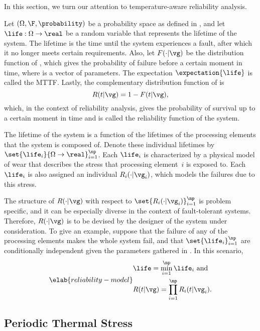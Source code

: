 In this section, we turn our attention to temperature-aware reliability
analysis.

Let $(\Omega, \F, \probability)$ be a probability space as defined in
, and let $\life: \Omega \to \real$ be a random
variable that represents the lifetime of the system. The lifetime is the time
until the system experiences a fault, after which it no longer meets certain
requirements. Also, let $F(\cdot | \vg)$ be the distribution function of \life,
which gives the probability of failure before a certain moment in time, where
\vg is a vector of parameters. The expectation $\expectation{\life}$ is called
the \ac{MTTF}. Lastly, the complementary distribution function of \life is
\[
  R(t | \vg) = 1 - F(t | \vg),
\]
which, in the context of reliability analysis, gives the probability of survival
up to a certain moment in time and is called the reliability function of the
system.

The lifetime \life of the system is a function of the lifetimes of the \np
processing elements that the system is composed of. Denote these individual
lifetimes by $\set{\life_i}{\Omega \to \real}_{i = 1}^\np$. Each $\life_i$ is
characterized by a physical model of wear \cite{jedec2016} that describes the
stress that processing element~$i$ is exposed to. Each $\life_i$ is also
assigned an individual $R_i(\cdot | \vg_i)$, which models the failures due to
this stress.

The structure of $R(\cdot | \vg)$ with respect to $\set{R_i(\cdot | \vg_i)}_{i =
1}^\np$ is problem specific, and it can be especially diverse in the context of
fault-tolerant systems. Therefore, $R(\cdot | \vg)$ is to be devised by the
designer of the system under consideration. To give an example, suppose that the
failure of any of the \np processing elements makes the whole system fail, and
that $\set{\life_i}_{i = 1}^\np$ are conditionally independent given the
parameters gathered in \vg. In this scenario,
\begin{equation} \elab{reliability-model}
  \begin{split}
    & \life = \min_{i = 1}^\np \life_i \text{ and} \\
    & R(t | \vg) = \prod_{i = 1}^\np R_i(t | \vg_i).
  \end{split}
\end{equation}

\subsection{Periodic Thermal Stress}

